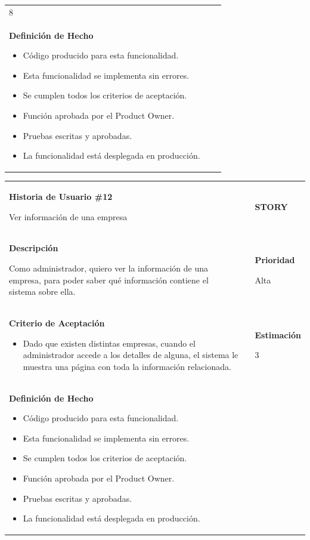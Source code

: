 \documentclass[12pt,a4paper]{article}
\begin{document}
\begin{center}
\begin{tabular}{|>{\columncolor[RGB]{215, 215, 215}} p{10cm} >{\columncolor[RGB]{215, 215, 215}} c >{\columncolor[RGB]{215, 215, 215}} p{2.5cm}|}
8 \\ 

\textbf{Definición de Hecho}

\begin{itemize}
\item Código producido para esta funcionalidad.
\item Esta funcionalidad se implementa sin errores.
\item Se cumplen todos los criterios de aceptación.
\item Función aprobada por el Product Owner.
\item Pruebas escritas y aprobadas.
\item La funcionalidad está desplegada en producción.
\end{itemize} & & \\
\hline 
\end{tabular}
\vspace{5mm}

\begin{tabular}{| p{10cm} c p{2.5cm}|}
\hline 
\textbf{Historia de Usuario \#12}

Ver información de una empresa & & \textbf{{\Large STORY}} \\ 
\textbf{Descripción}

Como administrador, quiero ver la información de una empresa, para
poder saber qué información contiene el sistema sobre ella. &  & \textbf{Prioridad}

Alta\\

\textbf{Criterio de Aceptación}

\begin{itemize}
\item Dado que existen distintas empresas, cuando el administrador
accede a los detalles de alguna, el sistema le muestra una página
con toda la información relacionada.
\end{itemize} & & \textbf{Estimación}

3 \\ 

\textbf{Definición de Hecho}

\begin{itemize}
\item Código producido para esta funcionalidad.
\item Esta funcionalidad se implementa sin errores.
\item Se cumplen todos los criterios de aceptación.
\item Función aprobada por el Product Owner.
\item Pruebas escritas y aprobadas.
\item La funcionalidad está desplegada en producción.
\end{itemize} & & \\
\hline 
\end{tabular}
\vspace{5mm}


\end{center}
\end{document}
